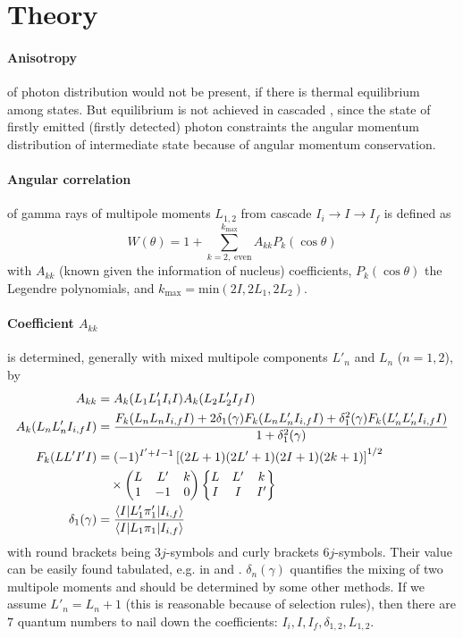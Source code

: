 \section{Theory}
\paragraph{Anisotropy} of photon distribution would not be present, if there is thermal equilibrium among states. But equilibrium is not achieved in cascaded \gag, since the state of firstly emitted (firstly detected) photon constraints the angular momentum distribution of intermediate state because of angular momentum conservation\cite{descr}. 

\paragraph{Angular correlation} of gamma rays of multipole moments $L_{1,2}$ from \gag cascade $I_i \rightarrow I \rightarrow I_f$ is defined as
\begin{equation}
   W(\theta) = 1 + \sum_{k=2, \; \text{even}}^{k_\text{max}} A_{kk} P_k (\cos \theta)
\end{equation}
with $A_{kk}$ (known given the information of nucleus) coefficients, $P_k (\cos \theta)$ the Legendre polynomials, and $k_\text{max} = \text{min}(2I, 2L_1, 2L_2)$\cite{siegbahn}.

\paragraph{Coefficient $A_{kk}$} is determined, generally with mixed multipole components $L'_n$ and $L_n$ ($n=1,2$), by
\begin{align}
   A_{kk} &= A_k(L_1 L_1' I_i I) A_k(L_2 L'_2 I_f I) \\
   A_k(L_n L'_n I_{i,f} I) &= \frac{F_k(L_n L_n I_{i,f} I) + 2 \delta_1(\gamma) F_k (L_n L'_n I_{i,f} I) + \delta_1^2(\gamma) F_{k}(L'_n L'_n I_{i,f} I)}{1 + \delta^2_1 (\gamma)} \\
   F_k(L L' I' I) &= (-1)^{I'+I-1} \left[ (2L + 1) (2L' + 1)(2I+1) (2k+1) \right]^{1/2} \notag \\
     & \quad \times \begin{pmatrix} L & L' & k \\ 1 & -1 & 0 \end{pmatrix} \begin{Bmatrix} L & L' & k \\ I & I & I'\end{Bmatrix} \\
   \delta_1 (\gamma) &= \frac{\braket{I | L'_1 \pi'_1 | I_{i,f}}}{ \braket{I | L_1 \pi_1 | I_{i,f}}}
\end{align}
with round brackets being $3j$-symbols and curly brackets $6j$-symbols\cite{siegbahn}. Their value can be easily found tabulated, e.g. in \cite{STEVENSON2002853} and \cite{369j}. $\delta_{n}(\gamma)$ quantifies the mixing of two multipole moments and should be determined by some other methods. If we assume $L'_n = L_n + 1$ (this is reasonable because of selection rules), then there are $7$ quantum numbers to nail down the coefficients: $I_i, I, I_f, \delta_{1,2}, L_{1,2}$\cite{siegbahn}.

